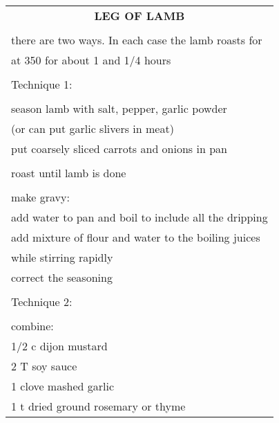 \documentclass[8pt]{report}
\begin{document}
\newpage

\centering

\begin{tabular}{|l|} \hline	%
 
\multicolumn{1}{|c|}{\textbf{LEG OF LAMB}}
\\
\\

\index{fish/meat!leg of lamb} \index{leg of lamb} \index{lamb!leg of}

there are two ways.  In each case the lamb roasts for\\
at 350 for about 1 and 1/4 hours\\
\\
Technique 1:\\
\\
season lamb with salt, pepper, garlic powder\\
(or can put garlic slivers in meat)\\
put coarsely sliced carrots and onions in pan\\
\\
roast until lamb is done\\
\\
make gravy:\\
\hspace{0.5 in}	add water to pan and boil to include all the
dripping\\
\hspace{0.5 in}	add mixture of flour and water to the boiling juices\\
\hspace{0.5 in}	while stirring rapidly\\
\hspace{0.5 in}	correct the seasoning\\
\\
Technique 2:\\
\\
combine:\\
\hspace{0.5 in}	1/2 c dijon mustard\\
\hspace{0.5 in}	2 T soy sauce\\
\hspace{0.5 in}	1 clove mashed garlic\\
\hspace{0.5 in}	1 t dried ground rosemary or thyme\\

\end{tabular}
\end{document}
